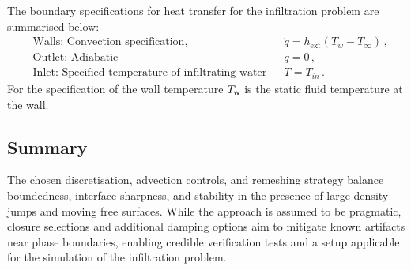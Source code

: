 The boundary specifications for heat transfer for the infiltration problem are summarised below:
 \begin{subequations}
  \begin{align}
    &\text{Walls: Convection specification, } && \dot{q} = h_{\text{ext}} (T_{w} - T_{\infty})\,,\\
    &\text{Outlet: Adiabatic} && \dot{q} = 0\,,\\
    &\text{Inlet: Specified temperature of infiltrating water} && T = T_{in}\,.
  \end{align}
\end{subequations}
For the specification of the wall temperature $T_{\mathsf {w}}$ is the static fluid temperature at the wall.

\subsection{Summary}
The chosen discretisation, advection controls, and 
remeshing strategy balance boundedness, interface sharpness, 
and stability in the presence of large density jumps and moving free surfaces.
 While the approach is assumed to be pragmatic, 
 closure selections and additional damping options aim to mitigate known artifacts near phase boundaries, 
 enabling credible verification tests and 
a setup applicable for the simulation of the infiltration problem.